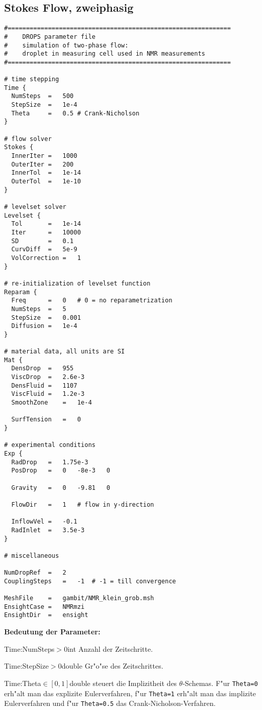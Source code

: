 \subsection{Stokes Flow, zweiphasig}
\begin{Code}
\begin{verbatim}
#=============================================================
#    DROPS parameter file
#    simulation of two-phase flow: 
#    droplet in measuring cell used in NMR measurements
#=============================================================

# time stepping
Time {
  NumSteps	=	500
  StepSize	=	1e-4
  Theta		=	0.5	# Crank-Nicholson
}

# flow solver
Stokes {
  InnerIter	=	1000
  OuterIter	=	200
  InnerTol	=	1e-14
  OuterTol	=	1e-10
}

# levelset solver
Levelset {
  Tol		=	1e-14
  Iter		=	10000
  SD		=	0.1
  CurvDiff	=	5e-9
  VolCorrection	=	1
}

# re-initialization of levelset function
Reparam { 
  Freq		=	0	# 0 = no reparametrization
  NumSteps	=	5
  StepSize	=	0.001
  Diffusion	=	1e-4
}

# material data, all units are SI
Mat {
  DensDrop	=	955
  ViscDrop	=	2.6e-3
  DensFluid	=	1107
  ViscFluid	=	1.2e-3
  SmoothZone	=	1e-4
  
  SurfTension	=	0
}

# experimental conditions
Exp {
  RadDrop	=	1.75e-3
  PosDrop	=	0	-8e-3	0
  
  Gravity	=	0	-9.81	0
  
  FlowDir	=	1	# flow in y-direction
  
  InflowVel	=	-0.1
  RadInlet	=	3.5e-3
}  

# miscellaneous

NumDropRef	=	2
CouplingSteps	=	-1	# -1 = till convergence

MeshFile	=	gambit/NMR_klein_grob.msh
EnsightCase	=	NMRmzi
EnsightDir	=	ensight
\end{verbatim}
\end{Code}

{\bf Bedeutung der Parameter: }\\

\begin{Desc}
{Time:NumSteps}{$>0$}{int}
    Anzahl der Zeitschritte.
\end{Desc}
%
\begin{Desc}
{Time:StepSize}{$>0$}{double}
Gr"o"se des Zeitschrittes.
\end{Desc}
%
\begin{Desc}
{Time:Theta}{$\in[0,1]$}{double}
steuert die Implizitheit des $\theta$-Schemas. F"ur
\verb|Theta=0| erh"alt man das explizite Eulerverfahren, f"ur
\verb|Theta=1| erh"alt man das implizite Eulerverfahren und f"ur
\verb|Theta=0.5| das Crank-Nicholson-Verfahren.
\end{Desc}


